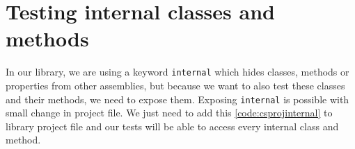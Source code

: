 \section{Testing internal classes and methods}

In our library, we are using a keyword \texttt{internal} which hides classes, methods or properties from other assemblies,
but because we want to also test these classes and their methods, we need to expose them. Exposing \texttt{internal} is possible
with small change in project file. We just need to add this \ref{code:csprojinternal} to library project file and our tests will be able to access every internal
class and method.


